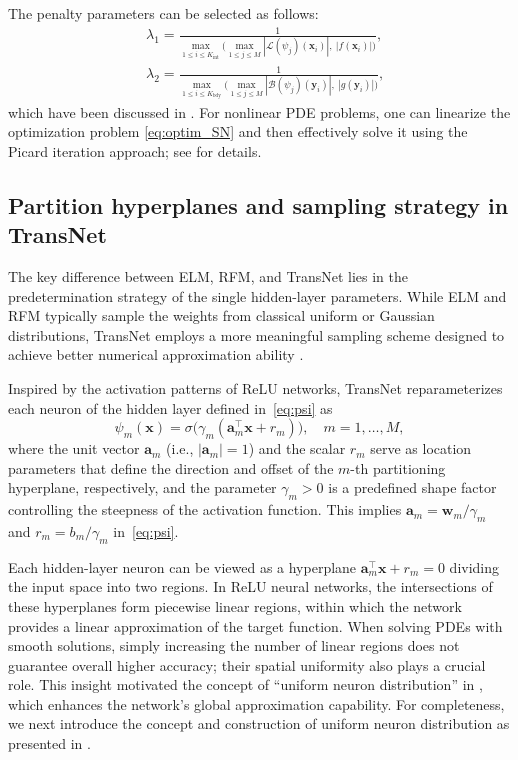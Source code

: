 \documentclass{article}
\newcommand{\ba}{\mathbf{a}}
\newcommand{\bw}{\mathbf{w}}
\newcommand{\bx}{\mathbf{x}}
\newcommand{\cB}{\mathcal{B}}
\newcommand{\cL}{\mathcal{L}}
\newcommand{\ds}{\displaystyle}
\begin{document}
The penalty parameters can be selected as follows: %
\begin{equation}\label{eq:w_p}
\begin{aligned}
&\ds \lambda_1 =\frac{1}{\max_{1\le i \le K_{\mathrm{int}}}\bigl(\max_{1\le j \le M}|\cL(\psi_j)(\bx_i)|,\ |f(\bx_i)|\bigr)},\\
&\ds \lambda_2 = \frac{1}{\max_{1\le i \le K_{\mathrm{bdy}}}\bigl(\max_{1\le j \le M}|\cB(\psi_j)(\mathbf{y}_i)|,\ |g(\mathbf{y}_i)|\bigr)},
\end{aligned}
\end{equation}
which have been discussed in \cite{Chi24,Lu25}. For nonlinear PDE problems, one can linearize the optimization problem \eqref{eq:optim_SN} and then effectively solve it using the Picard iteration approach; see \cite{TransNet} for details. 
 

\subsection{Partition hyperplanes and sampling strategy in TransNet}

The key difference between ELM, RFM, and TransNet lies in the predetermination strategy of the single hidden-layer parameters. While ELM and RFM typically sample the weights from classical uniform or Gaussian distributions, TransNet employs a more meaningful sampling scheme designed to achieve better numerical approximation ability \cite{TransNet}.

Inspired by the activation patterns of ReLU networks, TransNet reparameterizes each neuron of the hidden layer defined in~\eqref{eq:psi} as
\begin{equation}\label{eq:TransNet_Init}
\psi_m(\bx) = \sigma\big(\gamma_m (\mathbf{a}_m^\top \bx + r_m)\big),\quad m=1,\ldots,M,
\end{equation}
where the unit vector $\mathbf{a}_m$ (i.e., $|\ba_m|=1$) and the scalar $r_m$ serve as location parameters that define
the direction and offset of the $m$-th partitioning hyperplane, respectively, and
the parameter $\gamma_m>0$ is a predefined shape factor controlling the steepness of the activation function.
This implies $\ba_m=\bw_m/\gamma_m$ and $r_m = b_m/\gamma_m$ in~\eqref{eq:psi}.


Each hidden-layer neuron can be viewed as a hyperplane $\mathbf{a}_m^\top \bx + r_m = 0$ dividing the input space into two regions. In ReLU neural networks, the intersections of these hyperplanes form piecewise linear regions, within which the network provides a linear approximation of the target function. When solving PDEs with smooth solutions, simply increasing the number of linear regions does not guarantee overall higher accuracy; their spatial uniformity also plays a crucial role. This insight motivated the concept of ``uniform neuron distribution'' in \cite{TransNet}, which enhances the network’s global approximation capability. For completeness, we next introduce the concept and construction of uniform neuron distribution as presented in \cite{TransNet}.
\end{document}
